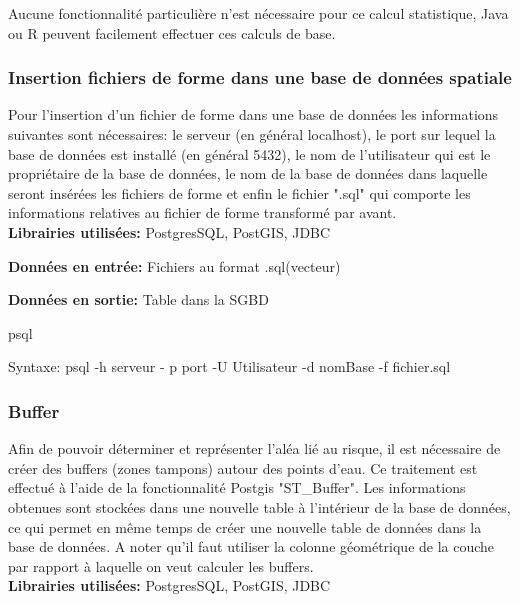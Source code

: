 Aucune fonctionnalité particulière n'est nécessaire pour ce calcul statistique, Java ou R peuvent facilement effectuer ces calculs de base.


\subsubsection{Insertion fichiers de forme dans une base de données spatiale}

Pour l'insertion d'un fichier de forme dans une base de données les informations suivantes sont nécessaires: le serveur (en général localhost), le port sur lequel la base de données est installé (en général 5432), le nom de l'utilisateur qui est le propriétaire de la base de données, le nom de la base de données dans laquelle seront insérées les fichiers de forme et enfin le fichier ".sql" qui comporte les informations relatives au fichier de forme transformé par avant.\\

\textbf{Librairies utilisées:} PostgresSQL, PostGIS, JDBC 

\textbf{Données en entrée:}  Fichiers au format .sql(vecteur)

\textbf{Données en sortie:} Table dans la SGBD \\

\begin{algorithm}[H]
\caption{\label{traitement5} psql}
Syntaxe:
psql -h serveur - p port -U Utilisateur -d nomBase -f fichier.sql\\
\end{algorithm}

\subsubsection{Buffer}

Afin de pouvoir déterminer et représenter l'aléa lié au risque, il est nécessaire de créer des buffers (zones tampons) autour des points d'eau. Ce traitement est effectué à l'aide de la fonctionnalité Postgis "ST\_Buffer". Les informations obtenues sont stockées dans une nouvelle table à l'intérieur de la base de données, ce qui permet en même temps de créer une nouvelle table de données dans la base de données. A noter qu'il faut utiliser la colonne géométrique de la couche par rapport à laquelle on veut calculer les buffers.\\

\textbf{Librairies utilisées:} PostgresSQL, PostGIS, JDBC 

